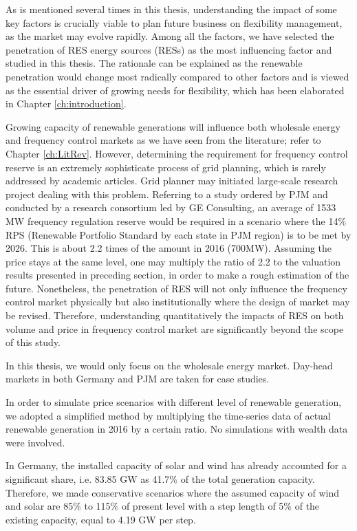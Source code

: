 As is mentioned several times in this thesis, understanding the impact of some key factors is crucially viable to plan future business on flexibility management, as the market may evolve rapidly. Among all the factors, we have selected the penetration of RES energy sources (RESs) as the most influencing factor and studied in this thesis. The rationale can be explained as the renewable penetration would change most radically compared to other factors and is viewed as the essential driver of growing needs for flexibility, which has been elaborated in Chapter \ref{ch:introduction}. 

Growing capacity of renewable generations will influence both wholesale energy and frequency control markets as we have seen from the literature; refer to Chapter \ref{ch:LitRev}. However, determining the requirement for frequency control reserve is an extremely sophisticate process of grid planning, which is rarely addressed by academic articles. Grid planner may initiated large-scale research project dealing with this problem. Referring to a study ordered by PJM and conducted by a research consortium led by GE Consulting\cite{GEEnergyConsulting2014}, an average of 1533 MW frequency regulation reserve would be required in a scenario where the 14\% RPS (Renewable Portfolio Standard by each state in PJM region) is to be met by 2026. This is about 2.2 times of the amount in 2016 (700MW). Assuming the price stays at the same level, one may multiply the ratio of 2.2 to the valuation results presented in preceding section, in order to make a rough estimation of the future. Nonetheless, the penetration of RES will not only influence the frequency control market physically but also institutionally where the design of market may be revised. Therefore, understanding quantitatively the impacts of RES on both volume and price in frequency control market are significantly beyond the scope of this study. 

In this thesis, we would only focus on the wholesale energy market. Day-head markets in both Germany and PJM are taken for case studies.

In order to simulate price scenarios with different level of renewable generation, we adopted a simplified method by multiplying the time-series data of actual renewable generation in 2016 by a certain ratio. No simulations with wealth data were involved. 

In Germany, the installed capacity of solar and wind has already accounted for a significant share, i.e. \num{83.85} GW as 41.7\% of the total generation capacity. Therefore, we made conservative scenarios where the assumed capacity of wind and solar are 85\% to 115\% of present level with a step length of 5\% of the existing capacity, equal to 4.19 GW per step. 

